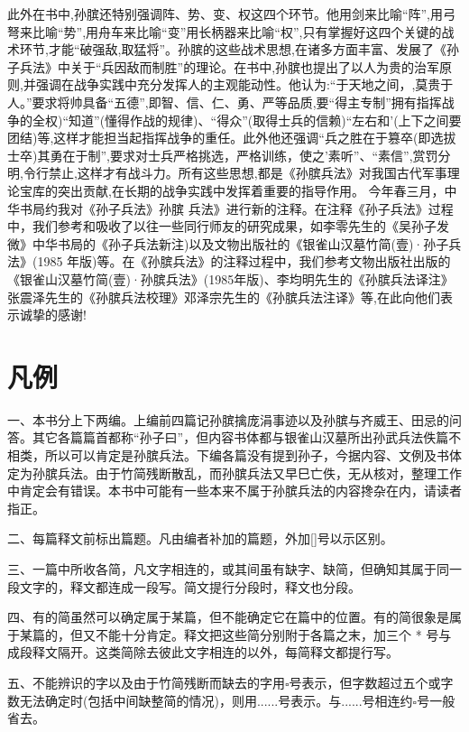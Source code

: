 \documentclass[12pt,UTF8]{ctexbook}
\begin{document}
此外在书中,孙膑还特别强调阵、势、变、权这四个环节。他用剑来比喻“阵”,用弓弩来比喻“势”,用舟车来比喻“变”用长柄器来比喻“权”,只有掌握好这四个关键的战术环节,才能“破强敌,取猛将”。孙膑的这些战术思想,在诸多方面丰富、发展了《孙子兵法》中关于“兵因敌而制胜”的理论。在书中,孙膑也提出了以人为贵的治军原则,并强调在战争实践中充分发挥人的主观能动性。他认为:“于天地之间，,莫贵于人。”要求将帅具备“五德”,即智、信、仁、勇、严等品质,要“得主专制”拥有指挥战争的全权)“知道”(懂得作战的规律)、“得众”(取得士兵的信赖)“左右和’(上下之间要团结)等,这样才能担当起指挥战争的重任。此外他还强调“兵之胜在于篡卒(即选拔士卒)其勇在于制”,要求对士兵严格挑选，严格训练，使之'素听”、“素信”,赏罚分明,令行禁止,这样才有战斗力。所有这些思想,都是《孙膑兵法》对我国古代军事理论宝库的突出贡献,在长期的战争实践中发挥着重要的指导作用。
今年春三月，中华书局约我对《孙子兵法》孙膑
兵法》进行新的注释。在注释《孙子兵法》过程中，我们参考和吸收了以往一些同行师友的研究成果，如李零先生的《吴孙子发微》中华书局的《孙子兵法新注)以及文物出版社的《银雀山汉墓竹简(壹)·孙子兵法》(1985 年版)等。在《孙膑兵法》的注释过程中，我们参考文物出版社出版的《银雀山汉墓竹简(壹)·孙膑兵法》(1985年版)、李均明先生的《孙膑兵法译注》张震泽先生的《孙膑兵法校理》邓泽宗先生的《孙膑兵法注译》等,在此向他们表示诚挚的感谢!

\chapter{凡例}

一、本书分上下两编。上编前四篇记孙膑擒庞涓事迹以及孙膑与齐威王、田忌的问答。其它各篇篇首都称“孙子曰”，但内容书体都与银雀山汉墓所出孙武兵法佚篇不相类，所以可以肯定是孙膑兵法。下编各篇没有提到孙子，今据内容、文例及书体定为孙膑兵法。由于竹简残断散乱，而孙膑兵法又早巳亡佚，无从核对，整理工作中肯定会有错误。本书中可能有一些本来不属于孙膑兵法的内容搀杂在内，请读者指正。

二、每篇释文前标出篇题。凡由编者补加的篇题，外加[]号以示区别。

三、一篇中所收各简，凡文字相连的，或其间虽有缺字、缺简，但确知其属于同一段文字的，释文都连成一段写。简文提行分段时，释文也分段。

四、有的简虽然可以确定属于某篇，但不能确定它在篇中的位置。有的简很象是属于某篇的，但又不能十分肯定。释文把这些简分别附于各篇之末，加三个 * 号与成段释文隔开。这类简除去彼此文字相连的以外，每简释文都提行写。

五、不能辨识的字以及由于竹简残断而缺去的字用$\square$号表示，但字数超过五个或字数无法确定时(包括中间缺整简的情况)，则用......号表示。与......号相连约$\square$号一般省去。
\end{document}

